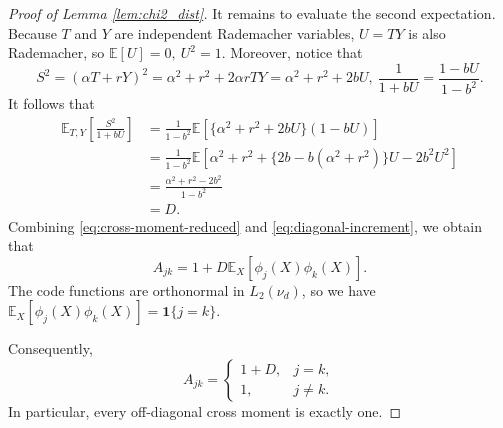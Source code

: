 \documentclass[11pt]{article}
\begin{document}
\begin{proof}[Proof of Lemma \ref{lem:chi2_dist}]
It remains to evaluate the second expectation.  Because \(T\) and \(Y\)
are independent Rademacher variables, \(U=TY\) is also Rademacher, so $\mathbb E[U]=0,
\ U^2=1$.
Moreover, notice that
\[
S^2
=
(\alpha T+rY)^2
=
\alpha^2+r^2+2\alpha rTY
=
\alpha^2+r^2+2bU,\ \frac1{1+bU}
=
\frac{1-bU}{1-b^2}.
\]
It follows that
\begin{align}
\mathbb E_{T,Y}
\left[
\frac{S^2}{1+bU}
\right]
&=
\frac1{1-b^2}
\mathbb E
\left[
\{\alpha^2+r^2+2bU\}(1-bU)
\right]
\nonumber\\
&=
\frac1{1-b^2}
\mathbb E
\left[
\alpha^2+r^2
+\{2b-b(\alpha^2+r^2)\}U
-2b^2U^2
\right]
\nonumber\\
&=
\frac{\alpha^2+r^2-2b^2}{1-b^2}
\nonumber\\
&=
D.
\label{eq:diagonal-increment}
\end{align}
Combining \eqref{eq:cross-moment-reduced} and
\eqref{eq:diagonal-increment}, we obtain that
\[
A_{jk}
=
1+D\mathbb E_X[\phi_j(X)\phi_k(X)].
\]
The code functions are orthonormal in \(L_2(\nu_d)\), so we have $\mathbb E_X[\phi_j(X)\phi_k(X)]
=
\mathbf 1\{j=k\}$.

Consequently,
\begin{equation}
A_{jk}
=
\begin{cases}
1+D, & j=k,\\
1,   & j\neq k.
\end{cases}
\label{eq:cross-moment-final}
\end{equation}
In particular, every off-diagonal cross moment is exactly one.


\end{proof}
\end{document}
